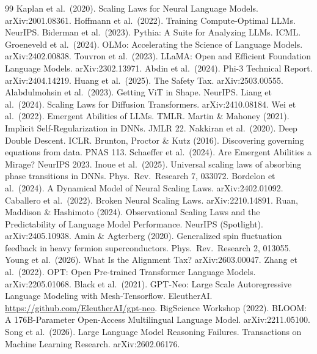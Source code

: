 \documentclass[11pt]{article}
\begin{document}
\begin{thebibliography}{99}
 Kaplan et al.\ (2020). Scaling Laws for Neural Language Models. arXiv:2001.08361.
 Hoffmann et al.\ (2022). Training Compute-Optimal LLMs. NeurIPS.
 Biderman et al.\ (2023). Pythia: A Suite for Analyzing LLMs. ICML.
 Groeneveld et al.\ (2024). OLMo: Accelerating the Science of Language Models. arXiv:2402.00838.
 Touvron et al.\ (2023). LLaMA: Open and Efficient Foundation Language Models. arXiv:2302.13971.
 Abdin et al.\ (2024). Phi-3 Technical Report. arXiv:2404.14219.
 Huang et al.\ (2025). The Safety Tax. arXiv:2503.00555.
 Alabdulmohsin et al.\ (2023). Getting ViT in Shape. NeurIPS.
 Liang et al.\ (2024). Scaling Laws for Diffusion Transformers. arXiv:2410.08184.
 Wei et al.\ (2022). Emergent Abilities of LLMs. TMLR.
 Martin \& Mahoney (2021). Implicit Self-Regularization in DNNs. JMLR 22.
 Nakkiran et al.\ (2020). Deep Double Descent. ICLR.
 Brunton, Proctor \& Kutz (2016). Discovering governing equations from data. PNAS 113.
 Schaeffer et al.\ (2024). Are Emergent Abilities a Mirage? NeurIPS 2023.
 Inoue et al.\ (2025). Universal scaling laws of absorbing phase transitions in DNNs. Phys.\ Rev.\ Research 7, 033072.
 Bordelon et al.\ (2024). A Dynamical Model of Neural Scaling Laws. arXiv:2402.01092.
 Caballero et al.\ (2022). Broken Neural Scaling Laws. arXiv:2210.14891.
 Ruan, Maddison \& Hashimoto (2024). Observational Scaling Laws and the Predictability of Language Model Performance. NeurIPS (Spotlight). arXiv:2405.10938.
 Amin \& Agterberg (2020). Generalized spin fluctuation feedback in heavy fermion superconductors. Phys.\ Rev.\ Research 2, 013055.
 Young et al.\ (2026). What Is the Alignment Tax? arXiv:2603.00047.
 Zhang et al.\ (2022). OPT: Open Pre-trained Transformer Language Models. arXiv:2205.01068.
 Black et al.\ (2021). GPT-Neo: Large Scale Autoregressive Language Modeling with Mesh-Tensorflow. EleutherAI. \url{https://github.com/EleutherAI/gpt-neo}.
 BigScience Workshop (2022). BLOOM: A 176B-Parameter Open-Access Multilingual Language Model. arXiv:2211.05100.
 Song et al.\ (2026). Large Language Model Reasoning Failures. Transactions on Machine Learning Research. arXiv:2602.06176.

\end{thebibliography}
\end{document}
